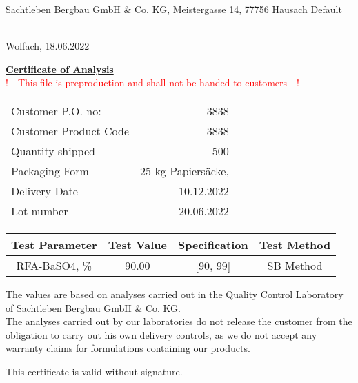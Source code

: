 \documentclass{scrlttr2}
\begin{document}
\begin{minipage}[c][4,5cm][c]{0.5\textwidth}
\underline{\tiny Sachtleben Bergbau GmbH \& Co. KG, Meistergasse 14, 77756 Hausach}
Default\\
\\
\end{minipage}
\begin{flushright}
Wolfach, 18.06.2022
\end{flushright}
\begin{center}
\underline{\textbf{\large Certificate of Analysis}}
\\\textcolor{red}{\tiny !---This file is preproduction and shall not be handed to customers---!}
\end{center}
\begin{tabular}{l r}
Customer P.O. no: & 3838 \\
Customer Product Code & 3838 \\
Quantity shipped & 500 \\
Packaging Form  & 25 kg Papiersäcke,  \\
Delivery Date & 10.12.2022 \\
Lot number & 20.06.2022 \\
\end{tabular}
\begin{center}
\begin{adjustbox}{width=\textwidth,totalheight=\textheight,keepaspectratio}
\begin{tabular}{cccc}
Test Parameter & Test Value & Specification & Test Method \\
\hline
RFA-BaSO4,  \% & 90.00 & [90, 99] & SB Method \\
\end{tabular}
\end{adjustbox}\end{center}
The values are based on analyses carried out in the Quality Control Laboratory of Sachtleben Bergbau GmbH \& Co. KG.\\
The analyses carried out by our laboratories do not release the customer from the obligation to carry out his own delivery controls, as we do not accept any warranty claims for formulations containing our products.

This certificate is valid without signature.
\end{document}
